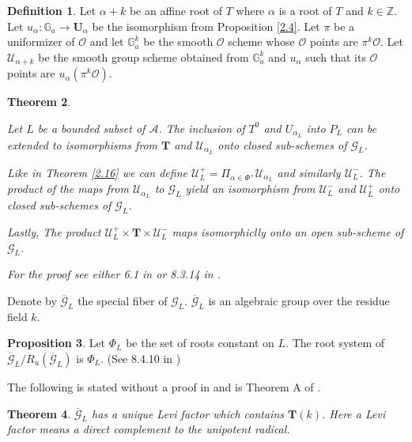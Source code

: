 \documentclass[12pt]{article}
\newcommand{\A}{\mathcal{A}}
\newcommand{\s}{\mathcal{O}}
\newcommand{\Z}{\mathbb{Z}}
\newcommand{\<}{\langle}
\renewcommand{\>}{\rangle}
\theoremstyle{plain}
\newtheorem{theorem}{Theorem}[section] %
\theoremstyle{definition}
\newtheorem{prop}[theorem]{Proposition}
\newtheorem{defn}[theorem]{Definition} %
\begin{document}
\begin{defn}
    Let $\alpha+k$ be an affine root of $T$ where $\alpha$ is a root of $T$ and $k\in\Z$. Let $u_\alpha:\mathbb{G}_a\rightarrow \mathbf{U}_\alpha$ be the isomorphism from Proposition \ref{2.4}. Let $\pi$ be a uniformizer of $\s$ and let $\mathbb{G}^k_a$ be the smooth $\s$ scheme whose $\s$ points are $\pi^k\s$. Let ${\mathcal U}_{\alpha+k}$ be the smooth group scheme obtained from $\mathbb{G}^k_a$ and $u_\alpha$ such that its $\s$ points are $u_\alpha(\pi^k\s)$.
\end{defn}

\begin{theorem}\label{open subscheme}

    Let $L$ be a bounded subset of $\A$. The inclusion of $T^0$ and $U_{\alpha_L}$ into $P_L$ can be extended to isomorphisms from $\mathbf{T}$ and ${\mathcal U}_{\alpha_L}$ onto closed sub-schemes of ${\mathcal G}_L$. 

    Like in Theorem \ref{2.16} we can define  ${\mathcal U}^+_{L}=\Pi_{\alpha\in \Phi^+}{\mathcal U}_{\alpha_L}$ and similarly ${\mathcal U}^-_{L}$. The product of the maps from ${\mathcal U}_{\alpha_L}$ to ${\mathcal G}_L$ yield an isomorphism from ${\mathcal U}^-_{L}$ and ${\mathcal U}^+_{L}$ onto closed sub-schemes of ${\mathcal G}_L$.

    Lastly, The product ${\mathcal U}^+_{L}\times \mathbf{T}\times {\mathcal U}^-_{L}$ maps isomorphiclly onto an open sub-scheme of ${\mathcal G}_L$.

    For the proof see either 6.1 in \cite{Landvogt1995ACO} or 8.3.14 in \cite{BruhatTitsTA}.
\end{theorem}

    Denote by $\overline{{\mathcal G}}_{L}$ the special fiber of ${\mathcal G}_{L}$. $\overline{{\mathcal G}}_{L}$ is an algebraic group over the residue field $k$.

    \begin{prop}\label{root system}
    Let $\Phi_L$ be the set of roots constant on $L$. The root system of  $\overline{{\mathcal G}}_{L}/R_u(\overline{{\mathcal G}}_{L})$ is $\Phi_L$. (See 8.4.10 in \cite{BruhatTitsTA})
    \end{prop}


    The following is stated without a proof in \cite{Tits1979ReductiveGO} and is Theorem A of \cite{McNinch2010LeviDO}.

\begin{theorem}\label{Levi decomposition}
    $\overline{{\mathcal G}}_{L}$ has a unique Levi factor which contains $\mathbf{T}(k)$. Here a Levi factor means a direct complement to the unipotent radical.
\end{theorem}
\end{document}

